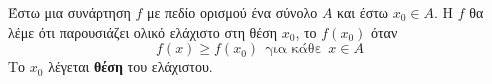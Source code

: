 Έστω μια συνάρτηση $ f $ με πεδίο ορισμού ένα σύνολο $ A $ και έστω $ x_0\in A $. Η $ f $ θα λέμε ότι παρουσιάζει ολικό ελάχιστο στη θέση $ x_0 $, το $ f(x_0) $ όταν 
\[ f(x)\geq f(x_0)\ \ \textrm{για κάθε}\ \ x\in A \]
Το $ x_0 $ λέγεται \textbf{θέση} του ελάχιστου.
